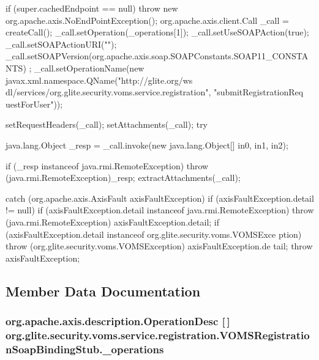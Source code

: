 \begin{DoxyCode}
                                                                                 
                                                                                       
                                                                              {
        if (super.cachedEndpoint == null) {
            throw new org.apache.axis.NoEndPointException();
        }
        org.apache.axis.client.Call _call = createCall();
        _call.setOperation(_operations[1]);
        _call.setUseSOAPAction(true);
        _call.setSOAPActionURI("");
        _call.setSOAPVersion(org.apache.axis.soap.SOAPConstants.SOAP11_CONSTANTS)
      ;
        _call.setOperationName(new javax.xml.namespace.QName("http://glite.org/ws
      dl/services/org.glite.security.voms.service.registration", "submitRegistrationReq
      uestForUser"));

        setRequestHeaders(_call);
        setAttachments(_call);
 try {        java.lang.Object _resp = _call.invoke(new java.lang.Object[] {in0, 
      in1, in2});

        if (_resp instanceof java.rmi.RemoteException) {
            throw (java.rmi.RemoteException)_resp;
        }
        extractAttachments(_call);
  } catch (org.apache.axis.AxisFault axisFaultException) {
    if (axisFaultException.detail != null) {
        if (axisFaultException.detail instanceof java.rmi.RemoteException) {
              throw (java.rmi.RemoteException) axisFaultException.detail;
         }
        if (axisFaultException.detail instanceof org.glite.security.voms.VOMSExce
      ption) {
              throw (org.glite.security.voms.VOMSException) axisFaultException.de
      tail;
         }
   }
  throw axisFaultException;
}
    }
\end{DoxyCode}


\subsection{Member Data Documentation}
\hypertarget{classorg_1_1glite_1_1security_1_1voms_1_1service_1_1registration_1_1VOMSRegistrationSoapBindingStub_a990be83cb6e1a3679a41ff685fe1f1bc}{
\subsubsection[{\_\-operations}]{\setlength{\rightskip}{0pt plus 5cm}org.apache.axis.description.OperationDesc \mbox{[}$\,$\mbox{]} {\bf org.glite.security.voms.service.registration.VOMSRegistrationSoapBindingStub.\_\-operations}}}
\label{classorg_1_1glite_1_1security_1_1voms_1_1service_1_1registration_1_1VOMSRegistrationSoapBindingStub_a990be83cb6e1a3679a41ff685fe1f1bc}


